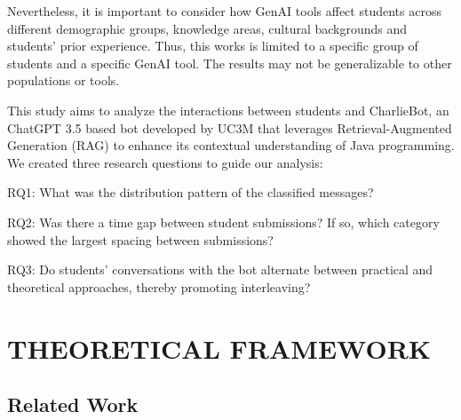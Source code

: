 \documentclass[a4paper,twoside]{article}
\begin{document}

Nevertheless, it is important to consider how GenAI tools affect students across
different demographic groups, knowledge areas, cultural backgrounds
\cite{catalan21} \cite{neo22} and students' prior experience. Thus, this works
is limited to a specific group of students and a specific GenAI tool. The
results may not be generalizable to other populations or tools.


This study aims to analyze the interactions between students and CharlieBot,
an ChatGPT 3.5 based bot developed by UC3M that leverages Retrieval-Augmented
Generation (RAG) to enhance its contextual understanding of Java programming.
We created three research questions to guide our analysis:

RQ1: What was the distribution pattern of the classified messages?

RQ2: Was there a time gap between student submissions? If so, which category
showed the largest spacing between submissions?

RQ3: Do students’ conversations with the bot alternate between practical and
theoretical approaches, thereby promoting interleaving?

\section{\uppercase{Theoretical Framework}}

\subsection{Related Work}


\end{document}
